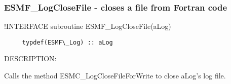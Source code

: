 
\setlength{\parskip}{0pt}
\setlength{\parindent}{0pt}
\setlength{\baselineskip}{11pt}
 
\def\bv{\begin{verbatim}}
\def\ev{\end{verbatim}}
\def\be{\begin{equation}}
\def\ee{\end{equation}}
\def\bea{\begin{eqnarray}}
\def\eea{\end{eqnarray}}
\def\bi{\begin{itemize}}
\def\ei{\end{itemize}}
\def\bn{\begin{enumerate}}
\def\en{\end{enumerate}}
\def\bd{\begin{description}}
\def\ed{\end{description}}
\def\({\left (}
\def\){\right )}
\def\[{\left [}
\def\]{\right ]}
\def\<{\left  \langle}
\def\>{\right \rangle}
\def\cI{{\cal I}}
\def\diag{\mathop{\rm diag}}
\def\tr{\mathop{\rm tr}}


 
\subsubsection [ESMF\_LogCloseFile] {ESMF\_LogCloseFile - closes a file from Fortran code}


  
   !INTERFACE 
   subroutine ESMF\_LogCloseFile(aLog)
  
\begin{verbatim}     typdef(ESMF\_Log) :: aLog
   \end{verbatim}
{\sf DESCRIPTION:\\ }


   Calls the method ESMC\_LogCloseFileForWrite to close aLog's 
   log file.
   
